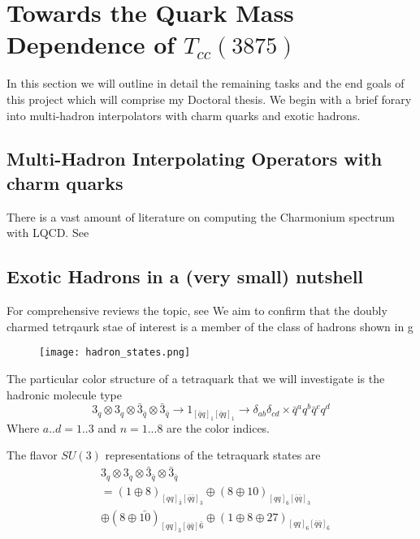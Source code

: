 
\chapter{Towards the Quark Mass Dependence of $T_{cc}(3875)$}
\label{sec:tcc}

In this section we will outline in detail the remaining tasks and the end goals of this project which will comprise my Doctoral thesis. We begin with a brief forary into multi-hadron interpolators with charm quarks and exotic hadrons. 
\section{Multi-Hadron Interpolating Operators with charm quarks}
There is a vast amount of literature on computing the Charmonium spectrum with LQCD. See 


\section{Exotic Hadrons in a (very small) nutshell}
For comprehensive reviews the topic, see \cite{Chen}\cite{Guo:2017jvc} \cite{Brambilla:2019esw}We aim to confirm that the doubly charmed tetrqaurk stae of interest is a member of the class of hadrons shown in g
\begin{figure}
    \texttt{[image: hadron\_states.png]}
\end{figure}

The particular color structure of a tetraquark that we will investigate is the hadronic molecule type 
\begin{equation}
    3_q \otimes 3_q \otimes \bar{3}_{\bar{q}} \otimes \bar{3}_{\bar{q}} \rightarrow 1_{[\bar{q}q]_1[\bar{q}q]_1} \rightarrow \delta_{ab} \delta_{cd} \times \bar{q}^aq^b\bar{q}^cq^d 
\end{equation}
Where $a..d = 1..3$ and $n=1...8$ are the color indices. 

The flavor $SU(3)$ representations of the tetraquark states are 
\begin{align}
& 3_q \otimes 3_q \otimes \bar{3}_{\bar{q}} \otimes \bar{3}_{\bar{q}} \nonumber \\
& = (1 \oplus 8)_{[qq]_{\bar{3}}[\bar{q}\bar{q}]_3} \oplus (8 \oplus 10)_{[qq]_6[\bar{q}\bar{q}]_3} \nonumber \\
& \oplus (8 \oplus \bar{10})_{[qq]_{\bar{3}}[\bar{q}\bar{q}]\bar{6}} \oplus (1 \oplus 8 \oplus 27)_{[qq]_6[\bar{q}\bar{q}]_{\bar{6}}}
\end{align}


